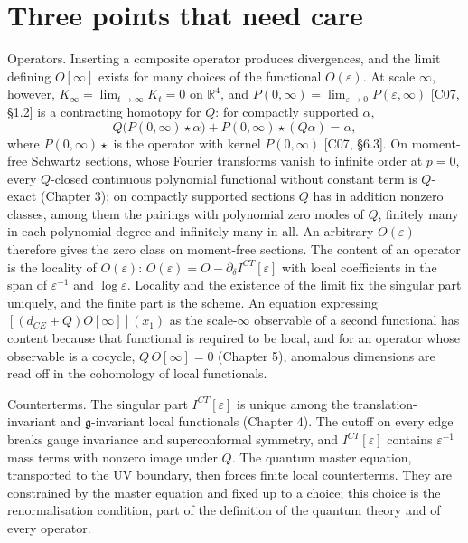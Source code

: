 \section{Three points that need care}

Operators. Inserting a composite operator produces divergences, and the limit defining $O[\infty]$ exists for many choices of the functional $O(\varepsilon)$. At scale $\infty$, however, $K_\infty=\lim_{t\to\infty}K_t=0$ on $\mathbb R^4$, and $P(0,\infty)=\lim_{\varepsilon\to0}P(\varepsilon,\infty)$ [C07, §1.2] is a contracting homotopy for $Q$: for compactly supported $\alpha$,
\[
Q\big(P(0,\infty)\star\alpha\big)+P(0,\infty)\star(Q\alpha)=\alpha ,
\]
where $P(0,\infty)\star$ is the operator with kernel $P(0,\infty)$ [C07, §6.3]. On moment-free Schwartz sections, whose Fourier transforms vanish to infinite order at $p=0$, every $Q$-closed continuous polynomial functional without constant term is $Q$-exact (Chapter 3); on compactly supported sections $Q$ has in addition nonzero classes, among them the pairings with polynomial zero modes of $Q$, finitely many in each polynomial degree and infinitely many in all. An arbitrary $O(\varepsilon)$ therefore gives the zero class on moment-free sections. The content of an operator is the locality of $O(\varepsilon)$: $O(\varepsilon)=O-\partial_\delta I^{CT}[\varepsilon]$ with local coefficients in the span of $\varepsilon^{-1}$ and $\log\varepsilon$. Locality and the existence of the limit fix the singular part uniquely, and the finite part is the scheme. An equation expressing $[(d_{CE}+Q)O[\infty]](x_1)$ as the scale-$\infty$ observable of a second functional has content because that functional is required to be local, and for an operator whose observable is a cocycle, $Q\,O[\infty]=0$ (Chapter 5), anomalous dimensions are read off in the cohomology of local functionals.

Counterterms. The singular part $I^{CT}[\varepsilon]$ is unique among the translation-invariant and $\mathfrak g$-invariant local functionals (Chapter 4). The cutoff on every edge breaks gauge invariance and superconformal symmetry, and $I^{CT}[\varepsilon]$ contains $\varepsilon^{-1}$ mass terms with nonzero image under $Q$. The quantum master equation, transported to the UV boundary, then forces finite local counterterms. They are constrained by the master equation and fixed up to a choice; this choice is the renormalisation condition, part of the definition of the quantum theory and of every operator.

